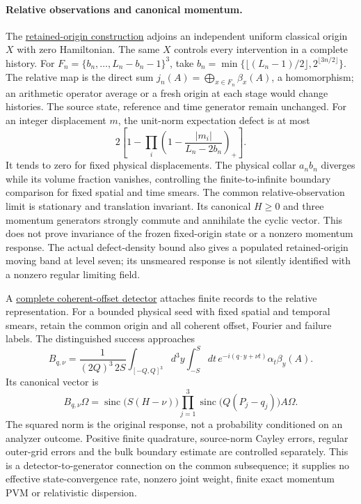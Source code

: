 \paragraph{Relative observations and canonical momentum.}
The \href{https://github.com/FloatingPragma/observer-patch-holography/blob/main/model/particle_primary_origin_momentum/PROOF.md}{retained-origin construction}
adjoins an independent uniform classical origin $X$ with zero
Hamiltonian. The same $X$ controls every intervention in a complete
history. For $F_n=\{b_n,\ldots,L_n-b_n-1\}^3$, take
$b_n=\min\{\lfloor(L_n-1)/2\rfloor,2^{\lfloor3n/2\rfloor}\}$.
The relative map is the direct sum
$j_n(A)=\bigoplus_{x\in F_n}\beta_x(A)$, a homomorphism; an arithmetic
operator average or a fresh origin at each stage would change histories.
The source state, reference and time generator remain unchanged.
For an integer displacement $m$, the unit-norm expectation defect is
at most
\[
 2\left[1-\prod_i\left(1-\frac{|m_i|}{L_n-2b_n}\right)_+\right].
\]
It tends to zero for fixed physical displacements. The physical collar
$a_nb_n$ diverges while its volume fraction vanishes, controlling the
finite-to-infinite boundary comparison for fixed spatial and time smears.
The common relative-observation limit is stationary and translation
invariant. Its canonical $H\ge0$ and three momentum generators strongly
commute and annihilate the cyclic vector. This does not prove invariance
of the frozen fixed-origin state or a nonzero momentum response.
The actual defect-density bound also gives a populated retained-origin
moving band at level seven; its unsmeared response is not silently
identified with a nonzero regular limiting field.

A \href{https://github.com/FloatingPragma/observer-patch-holography/blob/main/model/particle_primary_momentum_transfer/PROOF.md}{complete coherent-offset detector}
attaches finite records to the relative representation. For a bounded
physical seed with fixed spatial and temporal smears, retain the common
origin and all coherent offset, Fourier and failure labels. The
distinguished success approaches
\[
 B_{q,\nu}=\frac1{(2Q)^3\,2S}
  \int_{[-Q,Q]^3}\!d^3y\int_{-S}^{S}\!dt\,
       e^{-i(q\cdot y+\nu t)}\alpha_t\beta_y(A).
\]
Its canonical vector is
\[
 B_{q,\nu}\Omega=
 \operatorname{sinc}\!\bigl(S(H-\nu)\bigr)
 \prod_{j=1}^3\operatorname{sinc}\!\bigl(Q(P_j-q_j)\bigr)A\Omega.
\]
The squared norm is the original response, not a probability conditioned
on an analyzer outcome. Positive finite quadrature, source-norm Cayley
errors, regular outer-grid errors and the bulk boundary estimate are
controlled separately. This is a detector-to-generator connection on
the common subsequence; it supplies no effective state-convergence rate,
nonzero joint weight, finite exact momentum PVM or relativistic dispersion.

